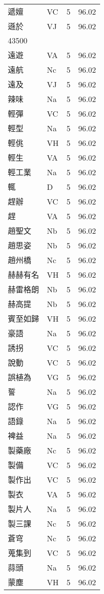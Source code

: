 \documentclass[twocolumn]{book}
\begin{document}
\begin{supertabular}{llrr}
遞嬗 & VC & 5 &  96.02\\
遜於 & VJ & 5 &  96.02\\
43500\\
遠遊 & VA & 5 &  96.02\\
遠航 & Nc & 5 &  96.02\\
遠及 & VJ & 5 &  96.02\\
辣味 & Na & 5 &  96.02\\
輕彈 & VC & 5 &  96.02\\
輕型 & Na & 5 &  96.02\\
輕佻 & VH & 5 &  96.02\\
輕生 & VA & 5 &  96.02\\
輕工業 & Na & 5 &  96.02\\
輒 & D & 5 &  96.02\\
趕辦 & VC & 5 &  96.02\\
趕 & VA & 5 &  96.02\\
趙聖文 & Nb & 5 &  96.02\\
趙思姿 & Nb & 5 &  96.02\\
趙州橋 & Nc & 5 &  96.02\\
赫赫有名 & VH & 5 &  96.02\\
赫雷格朗 & Nb & 5 &  96.02\\
赫高提 & Nb & 5 &  96.02\\
賓至如歸 & VH & 5 &  96.02\\
豪語 & Na & 5 &  96.02\\
誘拐 & VC & 5 &  96.02\\
說動 & VC & 5 &  96.02\\
誤植為 & VG & 5 &  96.02\\
誓 & Na & 5 &  96.02\\
認作 & VG & 5 &  96.02\\
語錄 & Na & 5 &  96.02\\
裨益 & Na & 5 &  96.02\\
製藥廠 & Nc & 5 &  96.02\\
製備 & VC & 5 &  96.02\\
製作出 & VC & 5 &  96.02\\
製衣 & VA & 5 &  96.02\\
製片人 & Na & 5 &  96.02\\
製三課 & Nc & 5 &  96.02\\
蒼穹 & Nc & 5 &  96.02\\
蒐集到 & VC & 5 &  96.02\\
蒜頭 & Na & 5 &  96.02\\
蒙塵 & VH & 5 &  96.02\\

\end{supertabular}
\end{document}
